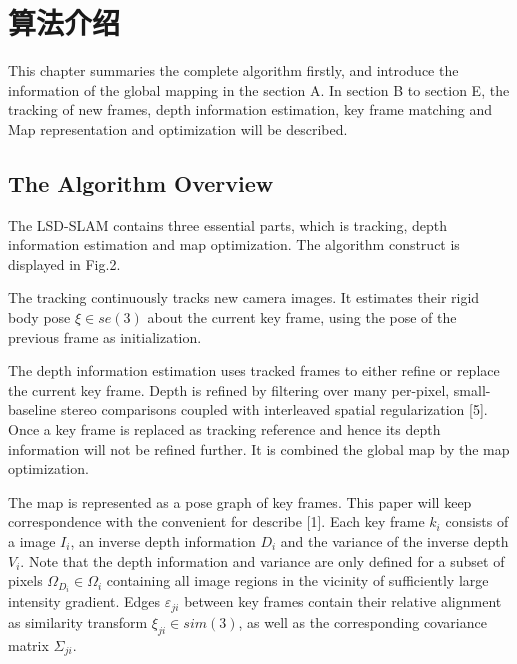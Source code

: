 
\chapter{算法介绍}
\label{chap:ALGORITHM}
This chapter summaries the complete algorithm firstly, and introduce the information of the global mapping in the section A. In section B to section E, the tracking of new frames, depth information estimation, key frame matching and Map representation and optimization will be described.


\section{The Algorithm Overview}
The LSD-SLAM contains three essential parts, which is tracking, depth information estimation and map optimization. The algorithm construct is displayed in Fig.2.

The tracking continuously tracks new camera images. It estimates their rigid body pose $\xi  \in se(3)$ about the current key frame, using the pose of the previous frame as initialization.

The depth information estimation uses tracked frames to either refine or replace the current key frame. Depth is refined by filtering over many per-pixel, small-baseline stereo comparisons coupled with interleaved spatial regularization [5]. Once a key frame is replaced as tracking reference and hence its depth information will not be refined further. It is combined the global map by the map optimization.

The map is represented as a pose graph of key frames. This paper will keep correspondence with the convenient for describe [1]. Each key frame ${k_i}$ consists of a image ${I_i}$, an inverse depth information ${D_i}$ and the variance of the inverse depth ${V_i}$. Note that the depth information and variance are only defined for a subset of pixels ${\Omega _{{D_i}}} \in {\Omega _i}$ containing all image regions in the vicinity of sufficiently large intensity gradient. Edges ${\varepsilon _{ji}}$ between key frames contain their relative alignment as similarity transform ${\xi _{ji}} \in sim(3)$, as well as the corresponding covariance matrix ${\Sigma _{ji}}$.

